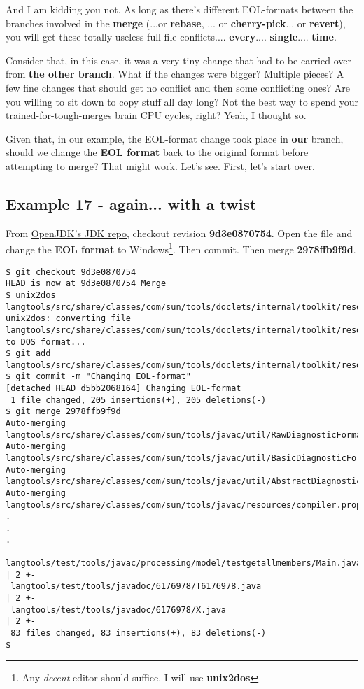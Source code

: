And I am kidding you not. As long as there's different EOL-formats between the branches involved in the {\bf merge}
(...or {\bf rebase}, ... or {\bf cherry-pick}... or {\bf revert}), you will get these totally useless full-file conflicts....
{\bf every}.... {\bf single}.... {\bf time}.

Consider that, in this case, it was a very tiny change that had to be carried over from {\bf the other branch}. What if
the changes were bigger? Multiple pieces? A few fine changes that should get no conflict and then some conflicting ones?
Are you willing to sit down to copy stuff all day long? Not the best way to spend your trained-for-tough-merges brain CPU
cycles, right? Yeah, I thought so.

Given that, in our example, the EOL-format change took place in {\bf our} branch, should we change the {\bf EOL format}
back to the original format before attempting to merge? That might work. Let's see. First, let's start over.

\subsection{Example 17 - again... with a twist}

From \hyperref[openjdk_repo]{OpenJDK's JDK repo}, checkout revision {\bf 9d3e0870754}. Open the file and change the
{\bf EOL format} to Windows\footnote{Any {\it decent} editor should suffice. I will use {\bf unix2dos}}. Then commit.
Then merge {\bf 2978ffb9f9d}.

\begin{lstlisting}[style=console_style,
	basicstyle=\small,
	caption={\bf example 17} - trying merge again]
$ git checkout 9d3e0870754
HEAD is now at 9d3e0870754 Merge
$ unix2dos langtools/src/share/classes/com/sun/tools/doclets/internal/toolkit/resources/doclet.xml
unix2dos: converting file langtools/src/share/classes/com/sun/tools/doclets/internal/toolkit/resources/doclet.xml to DOS format...
$ git add langtools/src/share/classes/com/sun/tools/doclets/internal/toolkit/resources/doclet.xml
$ git commit -m "Changing EOL-format"
[detached HEAD d5bb2068164] Changing EOL-format
 1 file changed, 205 insertions(+), 205 deletions(-)
$ git merge 2978ffb9f9d
Auto-merging langtools/src/share/classes/com/sun/tools/javac/util/RawDiagnosticFormatter.java
Auto-merging langtools/src/share/classes/com/sun/tools/javac/util/BasicDiagnosticFormatter.java
Auto-merging langtools/src/share/classes/com/sun/tools/javac/util/AbstractDiagnosticFormatter.java
Auto-merging langtools/src/share/classes/com/sun/tools/javac/resources/compiler.properties
.
.
.
 langtools/test/tools/javac/processing/model/testgetallmembers/Main.java                                | 2 +-
 langtools/test/tools/javadoc/6176978/T6176978.java                                                     | 2 +-
 langtools/test/tools/javadoc/6176978/X.java                                                            | 2 +-
 83 files changed, 83 insertions(+), 83 deletions(-)
$
\end{lstlisting}

